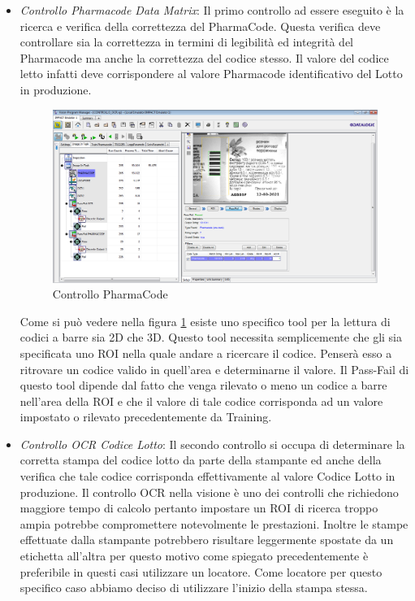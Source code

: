 \documentclass[12pt, a4paper, oneside]{book}
\begin{document}
\begin{itemize}
	\item \textit{Controllo Pharmacode Data Matrix}: Il primo controllo ad essere eseguito è la ricerca e verifica della correttezza del PharmaCode. Questa verifica deve controllare sia la correttezza in termini di legibilità ed integrità del Pharmacode ma anche la correttezza del codice stesso. Il valore del codice letto infatti deve corrispondere al valore Pharmacode identificativo del Lotto in produzione.
	

	
	\begin{figure}[H]
		\centering
		\includegraphics[width=13cm]{Immagini/VIS8}
		\caption{Controllo PharmaCode}
		\label{vis8}
	\end{figure}

	Come si può vedere nella figura \ref{vis8} esiste uno specifico tool per la lettura di codici a barre sia 2D che 3D. Questo tool necessita semplicemente che gli sia specificata uno ROI nella quale andare a ricercare il codice. Penserà esso a ritrovare un codice valido in quell'area e determinarne il valore. Il Pass-Fail di questo tool dipende dal fatto che venga rilevato o meno un codice a barre nell'area della ROI e che il valore di tale codice corrisponda ad un valore impostato o rilevato precedentemente da Training.  
	
	\item \textit{Controllo OCR Codice Lotto}: Il secondo controllo si occupa di determinare la corretta stampa del codice lotto da parte della stampante ed anche della verifica che tale codice corrisponda effettivamente al valore Codice Lotto in produzione. Il controllo OCR nella visione è uno dei controlli che richiedono maggiore tempo di calcolo pertanto impostare un ROI di ricerca troppo ampia potrebbe compromettere notevolmente le prestazioni. Inoltre le stampe effettuate dalla stampante potrebbero risultare leggermente spostate da un etichetta all'altra per questo motivo come spiegato precedentemente è preferibile in questi casi utilizzare un locatore.
	Come locatore per questo specifico caso abbiamo deciso di utilizzare l'inizio della stampa stessa. 
	

\end{itemize}
\end{document}
